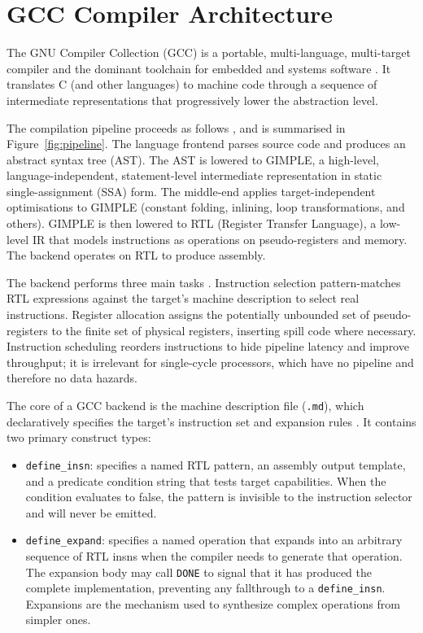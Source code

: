 \section{GCC Compiler Architecture}

The GNU Compiler Collection (GCC) is a portable, multi-language, multi-target compiler and the
dominant toolchain for embedded and systems software \cite{gcc-internals}. It translates C (and other
languages) to machine code through a sequence of intermediate representations that progressively lower
the abstraction level.

The compilation pipeline proceeds as follows \cite{gcc-internals}, and is summarised in
Figure~\ref{fig:pipeline}. The language frontend parses source
code and produces an abstract syntax tree (AST). The AST is lowered to GIMPLE, a high-level,
language-independent, statement-level intermediate representation in static single-assignment (SSA)
form. The middle-end applies target-independent optimisations to GIMPLE (constant folding, inlining,
loop transformations, and others). GIMPLE is then lowered to RTL (Register Transfer Language), a
low-level IR that models instructions as operations on pseudo-registers and memory. The backend
operates on RTL to produce assembly.

The backend performs three main tasks \cite{gcc-internals}. Instruction selection pattern-matches RTL
expressions against the target's machine description to select real instructions. Register allocation
assigns the potentially unbounded set of pseudo-registers to the finite set of physical registers,
inserting spill code where necessary. Instruction scheduling reorders instructions to hide pipeline
latency and improve throughput; it is irrelevant for single-cycle processors, which have no pipeline
and therefore no data hazards.

The core of a GCC backend is the machine description file (\texttt{.md}), which declaratively
specifies the target's instruction set and expansion rules \cite{gcc-internals}. It contains two
primary construct types:

\begin{itemize}
  \item \texttt{define\_insn}: specifies a named RTL pattern, an assembly output template, and a
        predicate condition string that tests target capabilities. When the condition evaluates to
        false, the pattern is invisible to the instruction selector and will never be emitted.
  \item \texttt{define\_expand}: specifies a named operation that expands into an arbitrary sequence
        of RTL insns when the compiler needs to generate that operation. The expansion body may call
        \texttt{DONE} to signal that it has produced the complete implementation, preventing any
        fallthrough to a \texttt{define\_insn}. Expansions are the mechanism used to synthesize
        complex operations from simpler ones.
\end{itemize}

